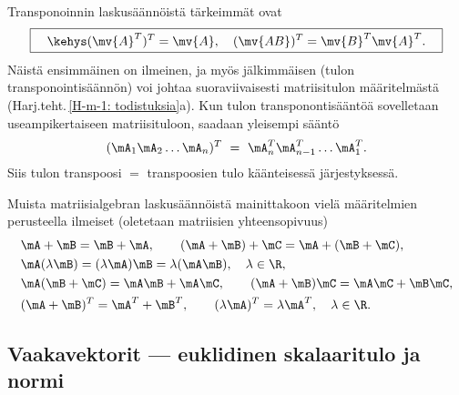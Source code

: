 Transponoinnin laskusäännöistä tärkeimmät ovat
\[ 
\boxed{ \quad \kehys (\mv{A}^T)^T = \mv{A}, \quad (\mv{AB})^T =  \mv{B}^T \mv{A}^T. \quad } 
\]
Näistä ensimmäinen on ilmeinen, ja myös jälkimmäisen (tulon transponointisäännön) voi johtaa 
suoraviivaisesti matriisitulon määritelmästä (Harj.teht.\,\ref{H-m-1: todistuksia}a). Kun tulon
transponontisääntöä sovelletaan useampikertaiseen matriisituloon, saadaan yleisempi sääntö
\[ 
(\mA_1 \mA_2 \ldots \mA_n)^T\ =\ \mA_n^T \mA_{n-1}^T \ldots \mA_1^T. 
\]
Siis tulon transpoosi $=$ transpoosien tulo käänteisessä järjestyksessä. 

Muista matriisialgebran laskusäännöistä mainittakoon vielä määritelmien perusteella ilmeiset 
(oletetaan matriisien yhteensopivuus)
\[ 
\begin{aligned}
&\mA + \mB = \mB + \mA, \quad\quad (\mA + \mB) + \mC = \mA + (\mB + \mC), \\ 
&\mA(\lambda \mB) = (\lambda \mA) \mB = \lambda (\mA\mB), \quad \lambda \in \R, \\
&\mA(\mB + \mC) = \mA\mB + \mA\mC, \quad\quad (\mA + \mB) \mC = \mA\mC + \mB\mC, \\
&(\mA + \mB)^T = \mA^T + \mB^T, \quad\quad (\lambda \mA)^T = \lambda \mA^T, \quad \lambda \in \R.
\end{aligned} 
\]

\subsection{Vaakavektorit --- euklidinen skalaaritulo ja normi}

